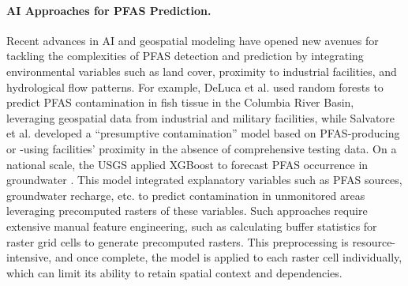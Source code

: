 \paragraph{AI Approaches for PFAS Prediction.}
Recent advances in AI and geospatial modeling have opened new avenues for tackling the complexities of PFAS detection and prediction by integrating environmental variables such as land cover, proximity to industrial facilities, and hydrological flow patterns. For example, DeLuca et al. \cite{DeLuca_Mullikin_Brumm_2023} used random forests to predict PFAS contamination in fish tissue in the Columbia River Basin, leveraging geospatial data from industrial and military facilities, while Salvatore et al. \cite{Salvatore_Mok_Garrett_2022} developed a \enquote{presumptive contamination} model based on PFAS-producing or -using facilities' proximity in the absence of comprehensive testing data. On a national scale, the USGS applied XGBoost to forecast PFAS occurrence in groundwater \cite{Tokranov2023}. This model integrated explanatory variables such as PFAS sources, groundwater recharge, etc. to predict contamination in unmonitored areas leveraging precomputed rasters of these variables. Such approaches require extensive manual feature engineering, such as calculating buffer statistics for raster grid cells to generate precomputed rasters. This preprocessing is resource-intensive, and once complete, the model is applied to each raster cell individually, which can limit its ability to retain spatial context and dependencies.

